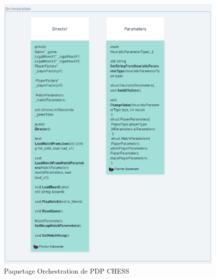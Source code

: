 \huge\documentclass{article}
\begin{document}
\begin{figure}[!h]
    \centering
    \includegraphics[scale = 0.3]{img/Package/Orchestration.png}
    \caption{Paquetage Orchestration de PDP CHESS}
    \label{pck:orchestration}
\end{figure}
\newpage
\end{document}

